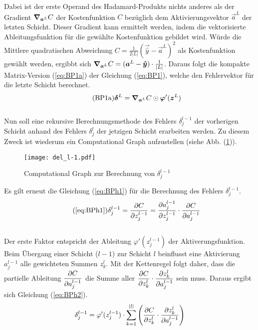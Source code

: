 \begin{appendices}
Dabei ist der erste Operand des Hadamard-Produkts nichts anderes als
der Gradient $\bm{\nabla}_{\bm{a}^L} C$ der Kostenfunktion $C$ bezüglich dem Aktivierungsvektor
$\vec{a}^L$ der letzten Schicht. Dieser Gradient kann ermittelt werden, indem die
vektorisierte Ableitungsfunktion für die gewählte Kostenfunktion gebildet wird. Würde die
Mittlere quadratischen Abweichung $C = \frac{1}{2|L|}(\vec{\hat{y}} -
\vec{a}^L)^2$ als Kostenfunktion gewählt werden, ergibbt sich
$\bm{\nabla}_{\bm{a}^L} C = (\bm{a}^L - \bm{\hat{y}}) \cdot \frac{1}{|L|}$.
\para{}
Daraus folgt die kompakte Matrix-Version (\ref{eq:BP1a}) der Gleichung
(\ref{eq:BP1}), welche den Fehlervektor für die letzte Schicht berechnet.
\\
\begin{equation}\tag{BP1a}\label{eq:BP1a}
  \bm{\delta}^L = \bm{\nabla}_{\bm{a}^L}C \odot \bm{\varphi}'(\bm{z}^L)
\end{equation}
\\
Nun soll eine rekursive Berechnungsmethode des Fehlers $\delta_j^{l-1}$
der vorherigen Schicht anhand des Fehlers $\delta_j^l$ der jetzigen Schicht
erarbeiten werden. Zu diesem Zweck ist wiederum ein Computational Graph aufzustellen
(siehe Abb. (\ref{fig:cg_L-1})).
\para{}
\begin{figure}[h!]
  \centering
  \texttt{[image: del\_l-1.pdf]}
  \caption{Computational Graph zur Berechnung von $\delta_j^{l-1}$}
  \label{fig:cg_L-1}
\end{figure}
\para{}
Es gilt erneut die Gleichung (\ref{eq:BPh1}) für die Berechnung des Fehlers $\delta_j^{l-1}$.
\\
\begin{equation}\tag{\ref{eq:BPh1}}
  \delta_j^{l-1} = \partderiv{C}{z_j^{l-1}} = \partderiv{a_j^{l-1}}{z_j^{l-1}} \cdot \partderiv{C}{a_j^{l-1}}
\end{equation}
\\
Der erste Faktor entspricht der Ableitung $\varphi'(z_j^{l-1})$ der Aktiverungsfunktion.
Beim Übergang einer Schicht ($l-1$) zur Schicht $l$ beinflusst eine Aktivierung
$a_j^{l-1}$ alle gewichteten Summen $z_k^l$. Mit der Kettenregel folgt daher,
dass die partielle Ableitung $\displaystyle\frac{\partial C}{\partial a_j^{l-1}}$ die Summe aller
$\displaystyle\frac{\partial C}{\partial z_k^l} \cdot \displaystyle\frac{\partial z_k^l}{\partial a_j^{l-1}}$ sein muss.
Daraus ergibt sich Gleichung (\ref{eq:BPh2}).
\\
\begin{equation}\label{eq:BPh2}
  \delta_j^{l-1} = \varphi'(z_j^{l-1}) \cdot \sum_{k=1}^{|l|} \left( \partderiv{C}{z_k^l} \cdot \partderiv{z_k^l}{a_j^{l-1}} \right)

\end{equation}
\end{appendices}
